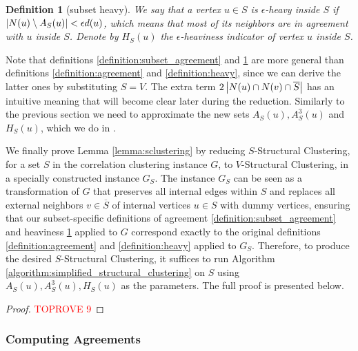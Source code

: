 \documentclass{article}
\newtheorem{definition}{Definition}[section]
\begin{document}
\begin{definition}[subset heavy]
\label{definition:subset_heavy}
We say that a vertex $u\in S$ is $\epsilon$-heavy inside $S$ if $\left|N(u) \setminus A_S(u)\right| < \epsilon d(u)$, which means that most of its neighbors are in agreement with $u$ inside $S$. Denote by $H_S(u)$ the $\epsilon$-heaviness indicator of vertex $u$ inside $S$.
\end{definition}

Note that definitions \ref{definition:subset_agreement} and \ref{definition:subset_heavy} are more general than definitions \ref{definition:agreement} and \ref{definition:heavy}, since we can derive the latter ones by substituting $S = V$. The extra term $2\left|N(u)\cap N(v)\cap \overline{S}\right|$ has an intuitive meaning that will become clear later during the reduction. Similarly to the previous section we need to approximate the new sets $A_S(u), A_S^3(u)$ and $H_S(u)$, which we do in .

We finally prove Lemma \ref{lemma:sclustering} by reducing $S$-Structural Clustering, for a set $S$ in the correlation clustering instance $G$, to $V$-Structural Clustering, in a specially constructed instance $G_S$. The instance $G_S$ can be seen as a transformation of $G$ that preserves all internal edges within $S$ and replaces all external neighbors $v \in \overline{S}$ of internal vertices $u \in S$ with dummy vertices, ensuring that our subset-specific definitions of agreement \ref{definition:subset_agreement} and heaviness \ref{definition:subset_heavy} applied to $G$ correspond exactly to the original definitions \ref{definition:agreement} and \ref{definition:heavy} applied to $G_S$. Therefore, to produce the desired $S$-Structural Clustering, it suffices to run Algorithm \ref{algorithm:simplified_structural_clustering} on $S$ using $A_S(u), A_S^3(u), H_S(u)$ as the parameters. The full proof is presented below.

\begin{proof}\textcolor{red}{TOPROVE 9}\end{proof}

\newcommand{\vagagr}{\abs{N(u)\cap N(v)} +
\abs{N(u)\triangle N(v)}- \abs{N(u)\cap N(v)\cap S}}


\subsubsection{Computing Agreements}\label{section:semi_agreement_cc}
\end{document}
